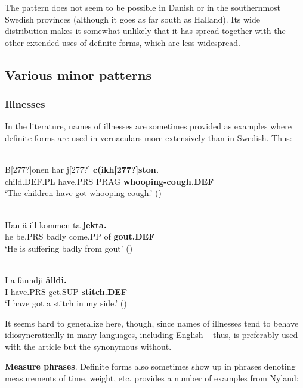 \z

The pattern does not seem to be possible in Danish or in the southernmost Swedish provinces (although it goes as far south as Halland). Its wide distribution makes it somewhat unlikely that it has spread together with the other extended uses of definite forms, which are less widespread. 

\subsection{ Various minor patterns}

\subsubsection{Illnesses}
 In the literature, names of illnesses are sometimes provided as examples where definite forms are used in vernaculars more extensively than in Swedish. Thus: 

\ea \label{} 
\\
\gll B[277?]onen  har  j[277?]  \textbf{c(ikh[277?]ston.}\\
child.DEF.PL  have.PRS  PRAG  \textbf{whooping-cough.DEF}\\
\glt ‘The children have got whooping-cough.’ (\citet[11]{Lundström1939})

\z

\ea \label{} 
\\
\gll Han  ä  ill  kommen  ta  \textbf{jekta.}\\
he  be.PRS  badly  come.PP  of  \textbf{gout.DEF}\\
  ‘He is suffering badly from gout’ (\citet{Broberg1936})
\z 
  
\ea \label{} 
\\
\gll I  a  fänndji  \textbf{ålldi.} \\
I  have.PRS  get.SUP  \textbf{stitch.DEF} \\
\glt ‘I have got a stitch in my side.’ (\citet[285]{AnderssonEtAl1999})

\z

It seems hard to generalize here, though, since names of illnesses tend to behave idiosyncratically in many languages, including English – thus,  is preferably used with the article but the synonymous  without.

\textbf{Measure phrases}. Definite forms also sometimes show up in phrases denoting measurements of time, weight, etc. \citet[9]{Lundström1939} provides a number of examples from Nyland: 

